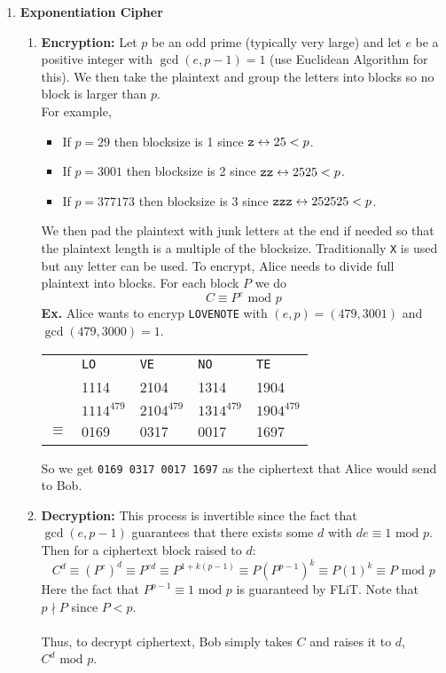 \documentclass[class=article, crop=false]{standalone}
\begin{document}
\begin{enumerate}
	\item \textbf{Exponentiation Cipher}
	\begin{enumerate}
		\item \textbf{Encryption:} Let $p$ be an odd prime (typically very large) and let $e$ be a
		positive integer with $\gcd(e,p-1)=1$ (use Euclidean Algorithm for this).
		We then take the plaintext and group the letters into blocks so no block is
		larger than $p$. \\
		For example, 
		\begin{itemize}
			\item If $p=29$ then blocksize is 1 since $\verb|z|\leftrightarrow 25<p$.
			\item If $p=3001$ then blocksize is 2 since $\verb|zz|\leftrightarrow 2525<p$.
			\item If $p=377173$ then blocksize is 3 since $\verb|zzz|\leftrightarrow 252525<p$.
		\end{itemize}
		We then pad the plaintext with junk letters at the end if needed so that the
		plaintext length is a multiple of the blocksize. Traditionally \verb|X| is used but any letter can
		be used. To encrypt, Alice needs to divide full plaintext into blocks. For each block $P$ we do
		$$C \equiv P^e \mbox{ mod } p$$
		\textbf{Ex.} Alice wants to encryp \verb|LOVENOTE| with $(e,p)=(479,3001)$ and $\gcd(479, 3000)=1$.
		\begin{table}[h!]
			\centering
			\begin{tabular}{c l l l l}
				$ $& \verb|LO|& \verb|VE|& \verb|NO|& \verb|TE| \\
				$ $& 1114& 2104& 1314& 1904 \\
				$ $& $1114^{479}$& $2104^{479}$ &$1314^{479}$ &$1904^{479}$ \\
				\hline
				$\equiv$ &0169 &0317 &0017 &1697
			\end{tabular}
		\end{table}
		So we get \verb|0169 0317 0017 1697| as the ciphertext that Alice would send to Bob.

		\item \textbf{Decryption:} This process is invertible since the fact that $\gcd(e, p-1)$
		guarantees that there exists some $d$ with $de \equiv 1 \mbox{ mod } p$.
		Then for a ciphertext block raised to $d$:
		$$C^d \equiv (P^e)^d \equiv P^{ed} \equiv P^{1+k(p-1)} \equiv P(P^{p-1})^k \equiv P(1)^k \equiv P\mbox{ mod }p$$
		Here the fact that $P^{p-1}\equiv 1\mbox{ mod } p$ is guaranteed by FLiT. Note that $p\nmid P$ since $P<p$. \\\\
		Thus, to decrypt ciphertext, Bob simply takes $C$ and raises it to $d$, $C^d\mbox{ mod }p$.
	\end{enumerate}
\end{enumerate}

\end{document}
